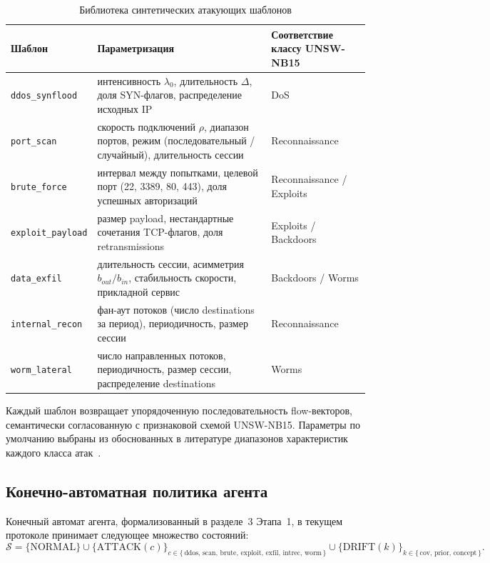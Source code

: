 \begin{table}[H]
\centering
\caption{Библиотека синтетических атакующих шаблонов}
\label{tab:attack-templates}
\renewcommand{\arraystretch}{1.25}
\setlength{\tabcolsep}{4pt}
\small
\begin{tabularx}{\linewidth}{@{}lXX@{}}
\toprule
\textbf{Шаблон} & \textbf{Параметризация} & \textbf{Соответствие классу UNSW-NB15} \\
\midrule
\texttt{ddos\_synflood} &
интенсивность \(\lambda_0\), длительность \(\Delta\), доля SYN-флагов,
распределение исходных IP &
DoS \\
\addlinespace
\texttt{port\_scan} &
скорость подключений \(\rho\), диапазон портов, режим (последовательный /
случайный), длительность сессии &
Reconnaissance \\
\addlinespace
\texttt{brute\_force} &
интервал между попытками, целевой порт (22, 3389, 80, 443),
доля успешных авторизаций &
Reconnaissance / Exploits \\
\addlinespace
\texttt{exploit\_payload} &
размер payload, нестандартные сочетания TCP-флагов, доля retransmissions &
Exploits / Backdoors \\
\addlinespace
\texttt{data\_exfil} &
длительность сессии, асимметрия \(b_{out}/b_{in}\), стабильность скорости,
прикладной сервис &
Backdoors / Worms \\
\addlinespace
\texttt{internal\_recon} &
фан-аут потоков (число destinations за период), периодичность,
размер сессии &
Reconnaissance \\
\addlinespace
\texttt{worm\_lateral} &
число направленных потоков, периодичность, размер сессии,
распределение destinations &
Worms \\
\bottomrule
\end{tabularx}
\end{table}

Каждый шаблон возвращает упорядоченную последовательность flow-векторов,
семантически согласованную с признаковой схемой UNSW-NB15. Параметры по
умолчанию выбраны из обоснованных в литературе диапазонов
характеристик каждого класса
атак~\cite{moustafa2015unsw, sharafaldin2018toward, sharafaldin2019ddos,
khraisat2019survey}.

\subsection{Конечно-автоматная политика агента}

Конечный автомат агента, формализованный в разделе~3 Этапа~1, в текущем
протоколе принимает следующее множество состояний:
\[
\mathcal{S} =
\{\text{NORMAL}\} \cup
\{\text{ATTACK}(c)\}_{c \in \{\,\text{ddos, scan, brute, exploit, exfil, intrec, worm}\,\}} \cup
\{\text{DRIFT}(k)\}_{k \in \{\,\text{cov, prior, concept}\,\}}.
\]

